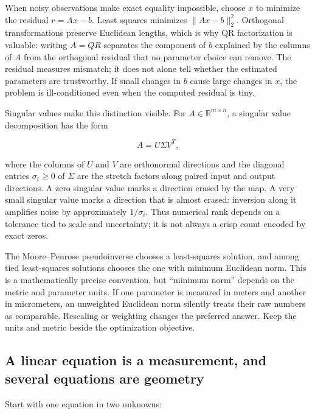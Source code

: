 When noisy observations make exact equality impossible, choose \(x\) to minimize the residual \(r=Ax-b\). Least squares minimizes \(\|Ax-b\|_2^2\). Orthogonal transformations preserve Euclidean lengths, which is why QR factorization is valuable: writing \(A=QR\) separates the component of \(b\) explained by the columns of \(A\) from the orthogonal residual that no parameter choice can remove. The residual measures mismatch; it does not alone tell whether the estimated parameters are trustworthy. If small changes in \(b\) cause large changes in \(x\), the problem is ill-conditioned even when the computed residual is tiny.

Singular values make this distinction visible. For \(A\in\mathbb R^{m\times n}\), a singular value decomposition has the form

\[
A=U\Sigma V^T,
\]

where the columns of \(U\) and \(V\) are orthonormal directions and the diagonal entries \(\sigma_i\ge 0\) of \(\Sigma\) are the stretch factors along paired input and output directions. A zero singular value marks a direction erased by the map. A very small singular value marks a direction that is almost erased: inversion along it amplifies noise by approximately \(1/\sigma_i\). Thus numerical rank depends on a tolerance tied to scale and uncertainty; it is not always a crisp count encoded by exact zeros.

The Moore--Penrose pseudoinverse chooses a least-squares solution, and among tied least-squares solutions chooses the one with minimum Euclidean norm. This is a mathematically precise convention, but ``minimum norm'' depends on the metric and parameter units. If one parameter is measured in meters and another in micrometers, an unweighted Euclidean norm silently treats their raw numbers as comparable. Rescaling or weighting changes the preferred answer. Keep the units and metric beside the optimization objective.

\subsection{A linear equation is a measurement, and several equations are geometry}\label{01-foundations-i-ch019-a-linear-equation-is-a-measurement-and-several-equations-are-geometry}

\hypertarget{01-foundations-i-ch019-a-linear-equation-is-a-measurement-and-several-equations-are-geometry}{}

Start with one equation in two unknowns:

